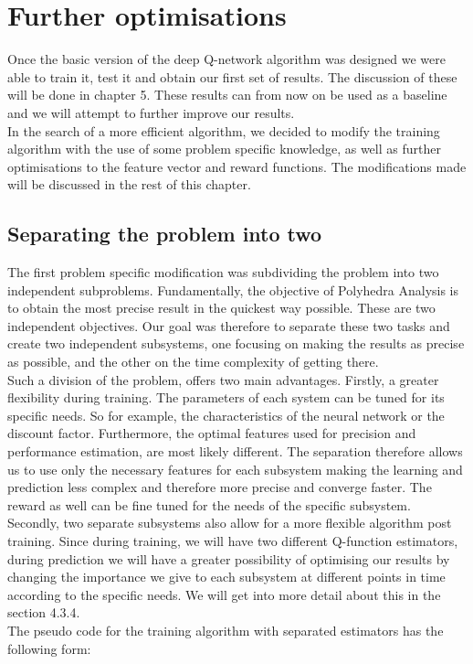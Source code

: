 \section{Further optimisations}
Once the basic version of the deep Q-network algorithm was designed we were able to train it, test it and obtain our first set of results. The discussion of these will be done in chapter 5. These results can from now on be used as a baseline and we will attempt to further improve our results.\\
In the search of a more efficient algorithm, we decided to modify the training algorithm with the use of some problem specific knowledge, as well as further optimisations to the feature vector and reward functions. The modifications made will be discussed in the rest of this chapter.


\subsection{Separating the problem into two}
The first problem specific modification was subdividing the problem into two independent subproblems. Fundamentally, the objective of Polyhedra Analysis is to obtain the most precise result in the quickest way possible. These are two independent objectives. Our goal was therefore to separate these two tasks and create two independent subsystems, one focusing on making the results as precise as possible, and the other on the time complexity of getting there.\\
 Such a division of the problem, offers two main advantages. Firstly, a greater flexibility during training. The parameters of each system can be tuned for its specific needs. So for example, the characteristics of the neural network or the discount factor. Furthermore, the optimal features used for precision and performance estimation, are most likely different. The separation therefore allows us to use only the necessary features for each subsystem making the learning and prediction less complex and therefore more precise and converge faster. The reward as well can be fine tuned for the needs of the specific subsystem.\\ 
 Secondly, two separate subsystems also allow for a more flexible algorithm post training. Since during training, we will have  two different Q-function estimators, during prediction we will have a greater possibility of optimising our results by changing the importance we give to each subsystem at different points in time according to the specific needs. We will get into more detail about this in the section 4.3.4.\\
 The pseudo code for the training algorithm with separated estimators has the following form:


